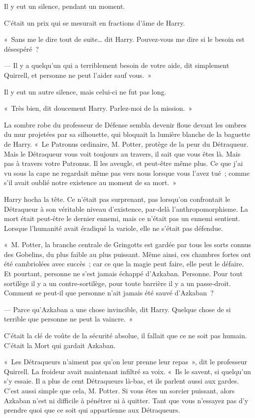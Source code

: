 Il y eut un silence, pendant un moment.

C'était un prix qui se mesurait en fractions d'âme de Harry.

«~Sans me le dire tout de suite… dit Harry. Pouvez-vous me dire si le besoin est désespéré~?

--- Il y a quelqu'un qui a terriblement besoin de votre aide, dit simplement Quirrell, et personne ne peut l'aider sauf vous.~»

Il y eut un autre silence, mais celui-ci ne fut pas long.

«~Très bien, dit doucement Harry. Parlez-moi de la mission.~»

La sombre robe du professeur de Défense sembla devenir floue devant les ombres du mur projetées par sa silhouette, qui bloquait la lumière blanche de la baguette de Harry. «~Le Patronus ordinaire, M. Potter, protège de la peur du Détraqueur. Mais le Détraqueur vous voit toujours au travers, il sait que vous êtes là. Mais pas à travers votre Patronus. Il les aveugle, et peut-être même plus. Ce que j'ai vu sous la cape ne regardait même pas vers nous lorsque vous l'avez tué~; comme s'il avait oublié notre existence au moment de sa mort.~»

Harry hocha la tête. Ce n'était pas surprenant, pas lorsqu'on confrontait le Détraqueur à son véritable niveau d'existence, par-delà l'anthropomorphisme. La mort était peut-être le dernier ennemi, mais ce n'était pas un ennemi sentient. Lorsque l'humanité avait éradiqué la variole, elle ne s'était pas défendue.

«~M. Potter, la branche centrale de Gringotts est gardée par tous les sorts connus des Gobelins, du plus faible au plus puissant. Même ainsi, ces chambres fortes ont été cambriolées avec succès~; car ce que la magie peut faire, elle peut le défaire. Et pourtant, personne ne s'est jamais échappé d'Azkaban. Personne. Pour tout sortilège il y a un contre-sortilège, pour toute barrière il y a un passe-droit. Comment se peut-il que personne n'ait jamais été sauvé d'Azkaban~?

--- Parce qu'Azkaban a une chose invincible, dit Harry. Quelque chose de si terrible que personne ne peut la vaincre.~»

C'était la clé de voûte de la sécurité absolue, il fallait que ce ne soit pas humain. C'était la Mort qui gardait Azkaban.

«~Les Détraqueurs n'aiment pas qu'on leur prenne leur repas~», dit le professeur Quirrell. La froideur avait maintenant infiltré sa voix. «~Ils le savent, si quelqu'un s'y essaie. Il a plus de cent Détraqueurs là-bas, et ils parlent aussi aux gardes. C'est aussi simple que cela, M. Potter. Si vous êtes un sorcier puissant, alors Azkaban n'est ni difficile à pénétrer ni à quitter. Tant que vous n'essayez pas d'y prendre quoi que ce soit qui appartienne aux Détraqueurs.

